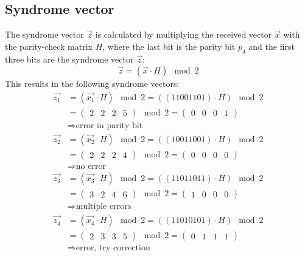 \subsection*{Syndrome vector}
The syndrome vector $\vec{z}$ is calculated by multiplying the received vector $\vec{x}$ with the parity-check matrix $H$, where the last bit is the parity bit $p_4$ and the first three bits are the syndrome vector $\vec{z}$:
\begin{equation*}
  \vec{z} = (\vec{x} \cdot H) \mod 2
\end{equation*}
This results in the following syndrome vectors:
\begin{align*}
  \vec{z_1} & = (\vec{x_1} \cdot H) \mod 2 = ((11001101) \cdot H) \mod 2\\
   &= \begin{pmatrix}2 &2 &2 &5\end{pmatrix} \mod 2 = \begin{pmatrix}0 &0 &0 &1\end{pmatrix}\\
   & \Rightarrow \text{error in parity bit}\\
  \vec{z_2} & = (\vec{x_2} \cdot H) \mod 2 = ((10011001) \cdot H) \mod 2\\
   &= \begin{pmatrix}2 &2 &2 &4\end{pmatrix} \mod 2 = \begin{pmatrix}0 &0 &0 &0\end{pmatrix}\\
   & \Rightarrow \text{no error}\\
  \vec{z_3} & = (\vec{x_3} \cdot H) \mod 2 = ((11011011) \cdot H) \mod 2\\
   &= \begin{pmatrix}3 &2 &4 &6\end{pmatrix} \mod 2 = \begin{pmatrix}1 &0 &0 &0\end{pmatrix}\\
   & \Rightarrow \text{multiple errors}\\
  \vec{z_4} & = (\vec{x_4} \cdot H) \mod 2 = ((11010101) \cdot H) \mod 2\\
   &= \begin{pmatrix}2 &3 &3 &5\end{pmatrix} \mod 2 = \begin{pmatrix}0 &1 &1 &1\end{pmatrix}\\
   & \Rightarrow \text{error, try correction}\\
\end{align*}


